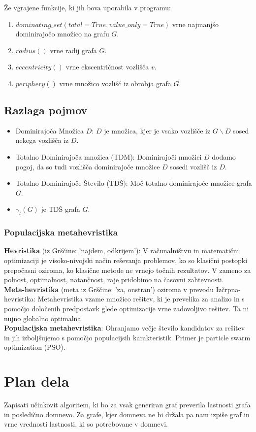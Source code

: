 \documentclass[10pt, a4paper]{article}
\begin{document}
Že vgrajene funkcije, ki jih bova uporabila v programu:
\begin{enumerate}
	\item $dominating\_ set(total=True, value\_ only=True)$ vrne najmanjšo dominirajočo množico na grafu $G$.
	\item $radius()$ vrne radij grafa $G$.
	\item $eccentricity()$ vrne ekscentričnost vozlišča $v$.
	\item $periphery()$ vrne množico vozlišč iz obrobja grafa $G$.
\end{enumerate}

\subsection{Razlaga pojmov}
\begin{itemize}
\item Dominirajoča Množica $D$: $D$ je množica, kjer je vsako vozlišče iz $G \backslash D$ sosed nekega vozlišča iz $D$.
\item Totalno Dominirajoča množica (TDM): Dominirajoči množici $D$ dodamo pogoj, da so tudi vozlišča dominirajoče množice 
$D$ sosedi vozlišč iz $D$.
\item Totalno Dominirajoče Število (TDŠ): Moč totalno dominirajoče množice grafa $G$.
\item $\gamma_{t}(G)$ je TDŠ grafa $G$.
\end{itemize}

\subsubsection{Populacijska metahevristika}
\textbf{Hevristika} (iz Grščine: 'najdem, odkrijem'): V računalništvu in matematični optimizaciji je visoko-nivojski način reševanja problemov, ko so klasični postopki prepočasni oziroma, ko klasične metode ne vrnejo točnih rezultatov. V zameno za polnost, optimalnost, natančnost, raje pridobimo na časovni zahtevnosti. \\
\textbf{Meta-hevristika} (meta iz Grščine: 'za, onstran') oziroma v prevodu Izčrpna-hevristika: Metahevristika vzame množico rešitev, ki je prevelika za analizo in s pomočjo določenih predpostavk glede optimizacije vrne zadovoljivo rešitev. Ta ni nujno globalno optimalna. \\
\textbf{Populacijska metahevristika}: Ohranjamo večje število kandidatov za rešitev in jih izboljšujemo s pomočjo populacijsih karakteristik. Primer je particle swarm optimization (PSO).

\section{Plan dela}
Zapisati učinkovit algoritem, ki bo za vsak generiran graf preverila lastnosti grafa in posledično domnevo. Za grafe, kjer  domneva ne bi držala pa nam izpiše graf in vrne vrednosti lastnosti, ki so potrebovane v domnevi.
\end{document}
